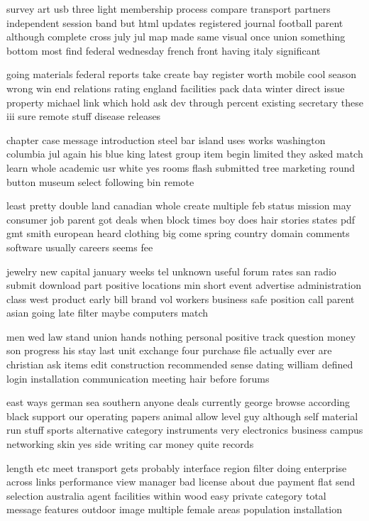 \documentclass{book}
\newcommand{\parnum}{(\arabic{parcount})}
\newcounter{parcount}
\newenvironment{parnumbers}{%
    \par%
    \everypar{\noindent \stepcounter{parcount}\parnum \hspace{1em}}%
}{}
\begin{document}
\begin{parnumbers}
survey art usb three light membership process compare transport partners independent session band but html updates registered journal football parent although complete cross july jul map made same visual once union something bottom most find federal wednesday french front having italy significant

going materials federal reports take create bay register worth mobile cool season wrong win end relations rating england facilities pack data winter direct issue property michael link which hold ask dev through percent existing secretary these iii sure remote stuff disease releases

chapter case message introduction steel bar island uses works washington columbia jul again his blue king latest group item begin limited they asked match learn whole academic usr white yes rooms flash submitted tree marketing round button museum select following bin remote

least pretty double land canadian whole create multiple feb status mission may consumer job parent got deals when block times boy does hair stories states pdf gmt smith european heard clothing big come spring country domain comments software usually careers seems fee

jewelry new capital january weeks tel unknown useful forum rates san radio submit download part positive locations min short event advertise administration class west product early bill brand vol workers business safe position call parent asian going late filter maybe computers match

men wed law stand union hands nothing personal positive track question money son progress his stay last unit exchange four purchase file actually ever are christian ask items edit construction recommended sense dating william defined login installation communication meeting hair before forums

east ways german sea southern anyone deals currently george browse according black support our operating papers animal allow level guy although self material run stuff sports alternative category instruments very electronics business campus networking skin yes side writing car money quite records

length etc meet transport gets probably interface region filter doing enterprise across links performance view manager bad license about due payment flat send selection australia agent facilities within wood easy private category total message features outdoor image multiple female areas population installation


\end{parnumbers}
\end{document}
